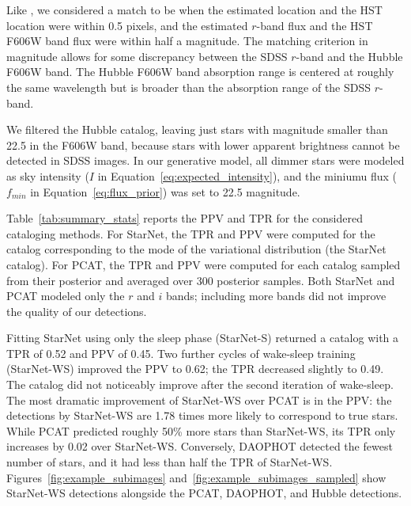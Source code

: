 Like \cite{Portillo_2017, Feder_2019}, we considered a match to be when the estimated location and the HST location were within 0.5 pixels,
and the estimated $r$-band flux and the HST F606W band flux were within half a
magnitude. 
The matching criterion in magnitude allows for some discrepancy between the SDSS $r$-band and the Hubble F606W band. 
The Hubble F606W band absorption range is centered at roughly the same wavelength but is broader than the absorption range of the SDSS $r$-band. 


We filtered the Hubble catalog, leaving just stars with magnitude smaller than 22.5 in the F606W band, because stars with lower apparent brightness cannot be detected in SDSS images. 
In our generative model, all dimmer stars were modeled as sky intensity ($I$ in Equation~\ref{eq:expected_intensity}), 
and the miniumu flux ($f_{min}$ in Equation~\eqref{eq:flux_prior}) was set to 22.5  magnitude. 

Table~\ref{tab:summary_stats} reports the PPV and TPR for the considered cataloging methods.
For StarNet, the TPR and PPV were computed for the catalog corresponding to the mode of the variational distribution (the StarNet catalog). 
For PCAT, the TPR and PPV were computed for each catalog sampled from their posterior and averaged over 300 posterior samples. 
Both StarNet and PCAT modeled only the $r$ and $i$ bands;
including more bands did not improve the quality of our detections. 

Fitting StarNet using only the sleep phase (StarNet-S) returned 
a catalog with a TPR of 0.52 and PPV of 0.45. Two further cycles of wake-sleep training (StarNet-WS) improved the PPV to 0.62; the TPR decreased slightly to 0.49.
The catalog did not noticeably improve after the second iteration of wake-sleep. 
The most dramatic improvement of StarNet-WS over PCAT is in the PPV: 
the detections by StarNet-WS are 1.78 times more likely to correspond to 
true stars. 
While PCAT predicted roughly 50\% more stars than StarNet-WS, 
its TPR only increases by 0.02 over StarNet-WS. 
Conversely, DAOPHOT detected the fewest number of stars, and it had less than half the TPR of StarNet-WS.
Figures~\ref{fig:example_subimages} and~\ref{fig:example_subimages_sampled} show StarNet-WS detections alongside the PCAT, DAOPHOT, and Hubble detections. 

